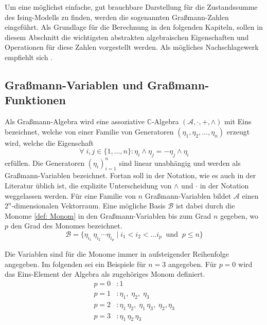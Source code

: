 Um eine möglichst einfache, gut brauchbare Darstellung für die Zustandssumme des Ising-Modells zu finden, werden die sogenannten Graßmann-Zahlen eingeführt. Als Grundlage für die Berechnung in den folgenden Kapiteln, sollen in diesem Abschnitt die wichtigsten abstrakten algebraischen Eigenschaften und Operationen für diese Zahlen vorgestellt werden. 
Als mögliches Nachschlagewerk empfiehlt sich \cite{BookRefForGV}.

\subsection{Graßmann-Variablen und Graßmann-Funktionen}

Als Graßmann-Algebra wird eine assoziative $\mathbb C$-Algebra $(\mathcal A, \cdot, +, \wedge)$ mit Eins bezeichnet, welche von einer Familie von Generatoren $(\eta_1, \eta_2, \dots, \eta_n)$  erzeugt wird, welche die Eigenschaft 
\begin{equation} \label{eq: antikommutingProb}
\forall\;i,j\in\{1,\dots,n\}: \eta_i \wedge \eta_j = - \eta_j \wedge \eta_i
\end{equation}
 erfüllen. Die Generatoren $(\eta_i)_{i=1}^n$ sind linear unabhängig und werden als Graßmann-Variablen bezeichnet. Fortan soll in der Notation, wie es auch in der Literatur üblich ist, die explizite Unterscheidung von $\wedge$ und $\cdot$ in der Notation weggelassen werden. Für eine Familie von $n$ Graßmann-Variablen bildet $\mathcal A$ einen $2^n$-dimensionalen Vektorraum. Eine mögliche Basis $\mathcal B$ ist dabei durch die Monome \eqref{def: Monom} in den Graßmann-Variablen bis zum Grad $n$ gegeben, wo $ p $ den Grad des Monomes bezeichnet.
\begin{equation} \label{def: Monom}
    \mathcal B = \{\eta_{i_1}\,  \eta_{i_2}  \cdots \eta_{i_p} \;| \; i_1 < i_2 < \dots i_p \;\;\text{und}\;\; p\leq n \}  
\end{equation}

\noindent Die Variablen sind für die Monome immer in aufsteigender Reihenfolge angegeben. Im folgenden sei ein Beispiele für $n = 3$ angegeben. Für $p = 0$ wird das Eins-Element der Algebra als zugehöriges Monom definiert. 
\begin{align}
    p = 0 &: 1 \nonumber \\
    p = 1 &: \eta_1,\; \eta_2,\; \eta_3 \nonumber \\
    p = 2 &: \eta_1\,\eta_2,\; \eta_1\,\eta_3,\; \eta_2,\eta_3 \nonumber \\
    p = 3 &: \eta_1\,\eta_2\,\eta_3 \nonumber 
\end{align}


